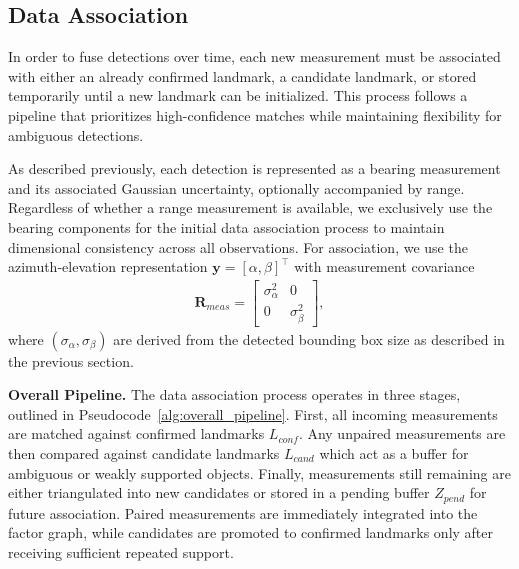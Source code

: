 \documentclass[
	parspace, %
	noindent, %
	final, %
]{elteikthesis}
\begin{document}
\subsection{Data Association}

In order to fuse detections over time, each new measurement must be associated with either an already confirmed landmark, a candidate landmark, or stored temporarily until a new landmark can be initialized. This process follows a pipeline that prioritizes high-confidence matches while maintaining flexibility for ambiguous detections.

As described previously, each detection is represented as a bearing measurement and its associated Gaussian uncertainty, optionally accompanied by range. Regardless of whether a range measurement is available, we exclusively use the bearing components for the initial data association process to maintain dimensional consistency across all observations. For association, we use the azimuth-elevation representation $\mathbf{y} = [\alpha,\beta]^\top$ with measurement covariance
\begin{align}
\mathbf{R}_{meas} = \begin{bmatrix}
\sigma_{\alpha}^2 & 0 \\
0 & \sigma_{\beta}^2
\end{bmatrix},
\end{align}
where $(\sigma_{\alpha},\sigma_{\beta})$ are derived from the detected bounding box size as described in the previous section.

\textbf{Overall Pipeline.} The data association process operates in three stages, outlined in Pseudocode~\ref{alg:overall_pipeline}. First, all incoming measurements are matched against confirmed landmarks $L_{conf}$. Any unpaired measurements are then compared against candidate landmarks $L_{cand}$ which act as a buffer for ambiguous or weakly supported objects. Finally, measurements still remaining are either triangulated into new candidates or stored in a pending buffer $Z_{pend}$ for future association. Paired measurements are immediately integrated into the factor graph, while candidates are promoted to confirmed landmarks only after receiving sufficient repeated support.
\end{document}

